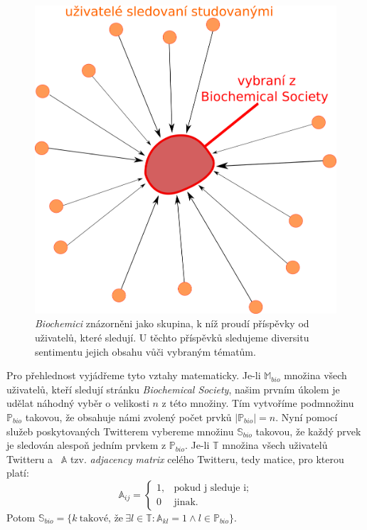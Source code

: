 \documentclass[12pt, a4paper]{article}
\numberwithin{equation}{section} 	%
\begin{document}
\begin{figure}[h]
\centering
\includegraphics[scale=0.35]{./Pics/followers.png}
    \caption{\textit{Biochemici} znázorněni jako skupina, k níž proudí příspěvky od uživatelů, které sledují. U těchto příspěvků sledujeme diversitu sentimentu jejich obsahu vůči vybraným tématům.}\label{fig:followers}
\end{figure}

Pro přehlednost vyjádřeme tyto vztahy matematicky. Je-li $\mathbb{M}_{bio}$ množina všech uživatelů, kteří sledují stránku \textit{Biochemical Society}, našim prvním úkolem je udělat náhodný vyběr o velikosti $n$ z této množiny. Tím vytvoříme podmnožinu $\mathbb{P}_{bio}$ takovou, že obsahuje námi zvolený počet prvků $\left\vert{\mathbb{P}_{bio}}\right\vert = n$. Nyní pomocí služeb poskytovaných Twitterem vybereme množinu $\mathbb{S}_{bio}$ takovou, že každý prvek je sledován alespoň jedním prvkem z $\mathbb{P}_{bio}$. Je-li $\mathbb{T}$ množina všech uživatelů Twitteru a~ $\mathbb{A}$ tzv. \textit{adjacency matrix} celého Twitteru, tedy matice, pro kterou platí:
\begin{equation}
    \mathbb{A}_{ij}=
    \begin{cases}
        1, &\text{pokud j sleduje i;}\\
        0 &\text{jinak.}
    \end{cases}
\end{equation}
Potom $\mathbb{S}_{bio} = \{k\ \text{takové, že}\ \exists l\in\mathbb{T}: \mathbb{A}_{kl} = 1 \wedge l\in\mathbb{P}_{bio} \}$.
\end{document}
